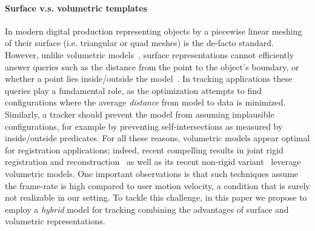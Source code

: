 \paragraph{Surface v.s. volumetric templates}
In modern digital production representing objects by a piecewise linear meshing of their surface (i.e. triangular or quad meshes) is the de-facto standard. However, unlike volumetric models~\cite{bloomenthal1997book}, surface representations cannot efficiently answer queries such as the distance from the point to the object's boundary, or whether a point lies inside/outside the model~\cite[Ch.1]{botsch2010book}. In tracking applications these queries play a fundamental role, as the optimization attempts to find configurations where the average \emph{distance} from model to data is minimized. Similarly, a tracker should prevent the model from assuming implausible configurations, for example by preventing self-intersections as measured by inside/outside predicates. For all these reasons, volumetric models appear optimal for registration applications; indeed, recent compelling results in joint rigid registration and reconstruction~\cite{newcombe2011kinfu} as well as its recent non-rigid variant~\cite{newcombe2015dynfusion} leverage volumetric models. One important observations is that such techniques assume the frame-rate is high compared to user motion velocity, a condition that is surely not realizable in our setting.  To tackle this challenge, in this paper we propose to employ a \emph{hybrid} model for tracking combining the advantages of surface and volumetric representations.



